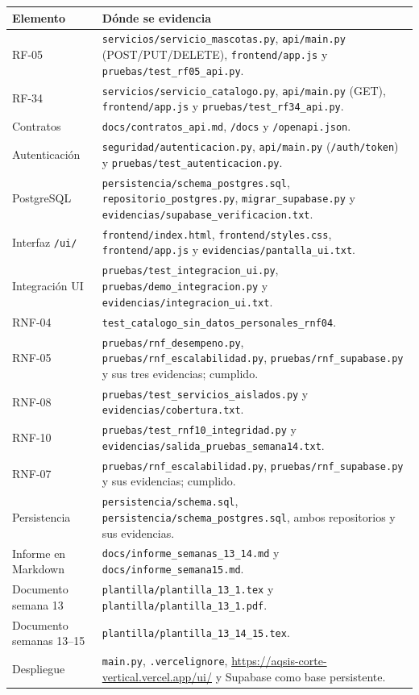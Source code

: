 \documentclass[11pt,a4paper]{article}
\newcommand{\code}[1]{\texttt{#1}}
\newcommand{\thead}[1]{\textbf{#1}}
\begin{document}
{\footnotesize
\begin{tabularx}{\linewidth}{@{}V{0.6}V{1.4}@{}}
\toprule
\thead{Elemento} & \thead{Dónde se evidencia} \\ \midrule
RF-05 & \code{servicios/servicio\_mascotas.py}, \code{api/main.py}
(POST/PUT/DELETE), \code{frontend/app.js} y
\code{pruebas/test\_rf05\_api.py}. \\
RF-34 & \code{servicios/servicio\_catalogo.py}, \code{api/main.py} (GET),
\code{frontend/app.js} y \code{pruebas/test\_rf34\_api.py}. \\
Contratos & \code{docs/contratos\_api.md}, \code{/docs} y
\code{/openapi.json}. \\
Autenticación & \code{seguridad/autenticacion.py}, \code{api/main.py}
(\code{/auth/token}) y \code{pruebas/test\_autenticacion.py}. \\
PostgreSQL & \code{persistencia/schema\_postgres.sql},
\code{repositorio\_postgres.py}, \code{migrar\_supabase.py} y
\code{evidencias/supabase\_verificacion.txt}. \\
Interfaz \code{/ui/} & \code{frontend/index.html}, \code{frontend/styles.css},
\code{frontend/app.js} y \code{evidencias/pantalla\_ui.txt}. \\
Integración UI & \code{pruebas/test\_integracion\_ui.py},
\code{pruebas/demo\_integracion.py} y \code{evidencias/integracion\_ui.txt}. \\
RNF-04 & \code{test\_catalogo\_sin\_datos\_personales\_rnf04}. \\
RNF-05 & \code{pruebas/rnf\_desempeno.py},
\code{pruebas/rnf\_escalabilidad.py}, \code{pruebas/rnf\_supabase.py} y sus
tres evidencias; cumplido. \\
RNF-08 & \code{pruebas/test\_servicios\_aislados.py} y
\code{evidencias/cobertura.txt}. \\
RNF-10 & \code{pruebas/test\_rnf10\_integridad.py} y
\code{evidencias/salida\_pruebas\_semana14.txt}. \\
RNF-07 & \code{pruebas/rnf\_escalabilidad.py},
\code{pruebas/rnf\_supabase.py} y sus evidencias; cumplido. \\
Persistencia & \code{persistencia/schema.sql},
\code{persistencia/schema\_postgres.sql}, ambos repositorios y sus evidencias. \\
Informe en Markdown & \code{docs/informe\_semanas\_13\_14.md} y
\code{docs/informe\_semana15.md}. \\
Documento semana 13 & \code{plantilla/plantilla\_13\_1.tex} y
\code{plantilla/plantilla\_13\_1.pdf}. \\
Documento semanas 13--15 & \code{plantilla/plantilla\_13\_14\_15.tex}. \\
Despliegue & \code{main.py}, \code{.vercelignore},
\url{https://aqsis-corte-vertical.vercel.app/ui/} y Supabase como base
persistente. \\
\bottomrule
\end{tabularx}
}
\end{document}
